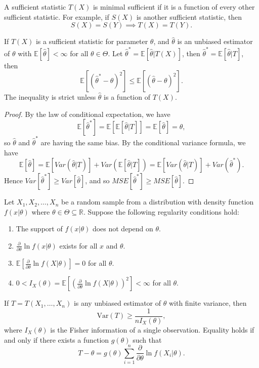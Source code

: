 \begin{definition}
    A sufficient statistic $T(X)$ is minimal sufficient if it is a function of every other sufficient statistic. 
    For example, if $S(X)$ is another sufficient statistic, then 
    \[ S(X) = S(Y) \implies T(X) = T(Y). \]
\end{definition}

\begin{lemma}
    If $T(X)$ is a sufficient statistic for parameter $\theta$, and $\hat{\theta}$ is an unbiased estimator of $\theta$ 
    with $\mathbb{E}[\hat{\theta}] < \infty$ for all $\theta \in \Theta$. Let $\hat{\theta}^* = \mathbb{E}[\hat{\theta}|T(X)]$, then $\hat{\theta}^* = \mathbb{E}[\hat{\theta} | T]$, then 
    \begin{equation}
        \mathbb{E}[(\hat{\theta}^* - \theta)^2] \leq \mathbb{E}[(\hat{\theta} - \theta)^2].
    \end{equation}
    The inequality is strict unless $\hat{\theta}$ is a function of $T(X)$.
\end{lemma}
\begin{proof}
    By the law of conditional expectation, we have
    \[
        \mathbb{E}[\hat{\theta}^*] = \mathbb{E}[\mathbb{E}[\hat{\theta}|T]] = \mathbb{E}[\hat{\theta}] = \theta,
    \]
    so $\hat{\theta}$ and $\hat{\theta}^*$ are having the same bias. By the conditional variance formula, we have
    \[
        \mathbb{E}[\hat{\theta}] = \mathbb{E}[Var(\hat{\theta}|T)] + Var(\mathbb{E}[\hat{\theta}|T]) = \mathbb{E}[Var(\hat{\theta}|T)] + Var(\hat{\theta}^*).
    \]
    Hence $Var[\hat{\theta}^*] \geq Var[\hat{\theta}]$, and so
    $MSE[\hat{\theta}^*] \geq MSE[\hat{\theta}]$.
\end{proof}

\begin{theorem}
    Let $X_1, X_2, \ldots, X_n$ be a random sample from a distribution with density function $f(x|\theta)$ where $\theta \in \Theta \subseteq \mathbb{R}$. Suppose the following regularity conditions hold:
    \begin{enumerate}
        \item The support of $f(x|\theta)$ does not depend on $\theta$.
        \item $\frac{\partial}{\partial \theta} \ln f(x|\theta)$ exists for all $x$ and $\theta$.
        \item $\mathbb{E}\left[\frac{\partial}{\partial \theta} \ln f(X|\theta)\right] = 0$ for all $\theta$.
        \item $0 < I_X(\theta) = \mathbb{E}\left[\left(\frac{\partial}{\partial \theta} \ln f(X|\theta)\right)^2\right] < \infty$ for all $\theta$.
    \end{enumerate}
    If $T = T(X_1, \ldots, X_n)$ is any unbiased estimator of $\theta$ with finite variance, then
    \[
        \text{Var}(T) \geq \frac{1}{nI_X(\theta)},
    \]
    where $I_X(\theta)$ is the Fisher information of a single observation. Equality holds if and only if there exists a function $g(\theta)$ such that
    \[
        T - \theta = g(\theta) \sum_{i=1}^n \frac{\partial}{\partial \theta} \ln f(X_i|\theta).
    \]
\end{theorem}

